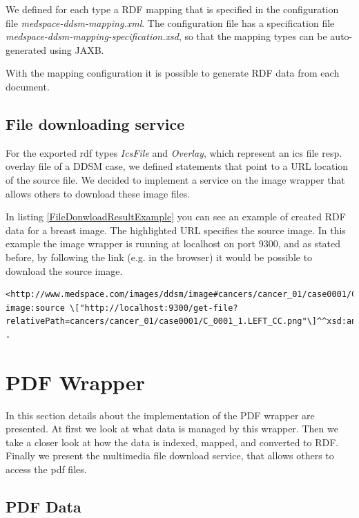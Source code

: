 We defined for each type a RDF mapping that is specified in the configuration file \emph{medspace-ddsm-mapping.xml}. The configuration file has a specification file \emph{medspace-ddsm-mapping-specification.xsd}, so that the mapping types can be auto-generated using JAXB.

With the mapping configuration it is possible to generate RDF data from each document.

\subsection{File downloading service}

For the exported rdf types \emph{IcsFile} and \emph{Overlay}, which represent an ics file resp. overlay file of a DDSM case, we defined statements that point to a URL location of the source file. We decided to implement a service on the image wrapper that allows others to download these image files. 

In listing \ref{FileDonwloadResultExample} you can see an example of created RDF data for a breast image. The highlighted URL specifies the source image. In this example the image wrapper is running at localhost on port 9300, and as stated before, by following the link (e.g. in the browser) it would be possible to download the source image.

\begin{lstlisting}[style=RdfCodeStyle, caption=image RDF conversion example, label=FileDonwloadResultExample]
<http://www.medspace.com/images/ddsm/image#cancers/cancer_01/case0001/C_0001_1.LEFT_CC.png>
image:source \["http://localhost:9300/get-file?relativePath=cancers/cancer_01/case0001/C_0001_1.LEFT_CC.png"\]^^xsd:anyURI .
\end{lstlisting}



\section{PDF Wrapper}
In this section details about the implementation of the PDF wrapper are presented.
At first we look at what data is managed by this wrapper. Then we take a closer look at how the data is indexed, mapped, and converted to RDF. Finally we present the multimedia file download service, that allows others to access the pdf files.

\subsection{PDF Data}


